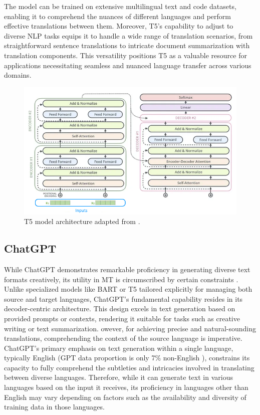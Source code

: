 The model can be trained on extensive multilingual text and code datasets, enabling it to comprehend the nuances of different languages and perform effective translations between them. 
Moreover, T5's capability to adjust to diverse NLP tasks equips it to handle a wide range of translation scenarios, from straightforward sentence translations to intricate document summarization with translation components. 
This versatility positions T5 as a valuable resource for applications necessitating seamless and nuanced language transfer across various domains.
\begin{figure}
	\centering
	\includegraphics[width=0.7\linewidth]{Figures/T5}
	\caption{T5 model architecture adapted from \cite{wang23}.}
	\label{fig:t5}
\end{figure}

\subsection{ChatGPT}
While ChatGPT demonstrates remarkable proficiency in generating diverse text formats creatively, its utility in MT is circumscribed by certain constraints \cite{lyu23}. 
Unlike specialized models like BART or T5 tailored explicitly for managing both source and target languages, ChatGPT's fundamental capability resides in its decoder-centric architecture. 
This design excels in text generation based on provided prompts or contexts, rendering it suitable for tasks such as creative writing or text summarization.
owever, for achieving precise and natural-sounding translations, comprehending the context of the source language is imperative. 
ChatGPT's primary emphasis on text generation within a single language, typically English (GPT data proportion is only 7\% non-English \cite{pourkamali24}), constrains its capacity to fully comprehend the subtleties and intricacies involved in translating between diverse languages. 
Therefore, while it can generate text in various languages based on the input it receives, its proficiency in languages other than English may vary depending on factors such as the availability and diversity of training data in those languages.

